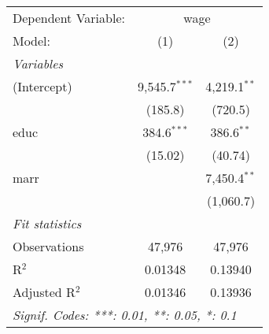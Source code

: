 
\begingroup
\centering
\begin{tabular}{lcc}
   \tabularnewline \midrule \midrule
   Dependent Variable: & \multicolumn{2}{c}{wage}\\
   Model:         & (1)             & (2)\\  
   \midrule
   \emph{Variables}\\
   (Intercept)    & 9,545.7$^{***}$ & 4,219.1$^{**}$\\   
                  & (185.8)         & (720.5)\\   
   educ           & 384.6$^{***}$   & 386.6$^{**}$\\   
                  & (15.02)         & (40.74)\\   
   marr           &                 & 7,450.4$^{**}$\\   
                  &                 & (1,060.7)\\   
   \midrule
   \emph{Fit statistics}\\
   Observations   & 47,976          & 47,976\\  
   R$^2$          & 0.01348         & 0.13940\\  
   Adjusted R$^2$ & 0.01346         & 0.13936\\  
   \midrule \midrule
   \multicolumn{3}{l}{\emph{Signif. Codes: ***: 0.01, **: 0.05, *: 0.1}}\\
\end{tabular}
\par\endgroup


